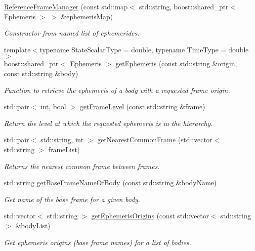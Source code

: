 \begin{DoxyCompactItemize}
\item 
\hyperlink{classtudat_1_1ephemerides_1_1ReferenceFrameManager_ac3b450ddaa8b7f1d55f923a6035205eb}{Reference\+Frame\+Manager} (const std\+::map$<$ std\+::string, boost\+::shared\+\_\+ptr$<$ \hyperlink{classtudat_1_1ephemerides_1_1Ephemeris}{Ephemeris} $>$ $>$ \&ephemeris\+Map)
\begin{DoxyCompactList}\small\item\em Constructor from named list of ephemerides. \end{DoxyCompactList}\item 
{\footnotesize template$<$typename State\+Scalar\+Type  = double, typename Time\+Type  = double$>$ }\\boost\+::shared\+\_\+ptr$<$ \hyperlink{classtudat_1_1ephemerides_1_1Ephemeris}{Ephemeris} $>$ \hyperlink{classtudat_1_1ephemerides_1_1ReferenceFrameManager_ab310bd5f84a55de111568b2ac34df5d4}{get\+Ephemeris} (const std\+::string \&origin, const std\+::string \&body)
\begin{DoxyCompactList}\small\item\em Function to retrieve the ephemeris of a body with a requested frame origin. \end{DoxyCompactList}\item 
std\+::pair$<$ int, bool $>$ \hyperlink{classtudat_1_1ephemerides_1_1ReferenceFrameManager_aa4528fe2bf8703b8e8502906cab4df5c}{get\+Frame\+Level} (const std\+::string \&frame)
\begin{DoxyCompactList}\small\item\em Return the level at which the requested ephemeris is in the hierarchy. \end{DoxyCompactList}\item 
std\+::pair$<$ std\+::string, int $>$ \hyperlink{classtudat_1_1ephemerides_1_1ReferenceFrameManager_a8892a638281b34e6e92489542ff03893}{get\+Nearest\+Common\+Frame} (std\+::vector$<$ std\+::string $>$ frame\+List)
\begin{DoxyCompactList}\small\item\em Returns the nearest common frame between frames. \end{DoxyCompactList}\item 
std\+::string \hyperlink{classtudat_1_1ephemerides_1_1ReferenceFrameManager_ac6e5305685fd540c736be8d55b1d2be8}{get\+Base\+Frame\+Name\+Of\+Body} (const std\+::string \&body\+Name)
\begin{DoxyCompactList}\small\item\em Get name of the base frame for a given body. \end{DoxyCompactList}\item 
std\+::vector$<$ std\+::string $>$ \hyperlink{classtudat_1_1ephemerides_1_1ReferenceFrameManager_a082415ca90c5db330fb8b7d916ac98b7}{get\+Ephemeris\+Origins} (const std\+::vector$<$ std\+::string $>$ \&body\+List)
\begin{DoxyCompactList}\small\item\em Get ephemeris origins (base frame names) for a list of bodies. \end{DoxyCompactList}\end{DoxyCompactItemize}


